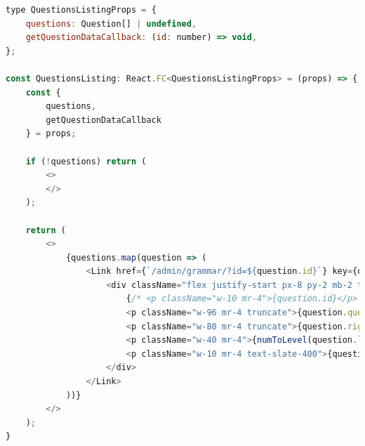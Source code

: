 \newpage
\begin{lstlisting}[language=JavaScript,caption={Úryvek z \M{/src/pages/admin/grammar/index.tsx}; generování seznamu otázek z databáze}, label={xslxgen}]
type QuestionsListingProps = {
    questions: Question[] | undefined,
    getQuestionDataCallback: (id: number) => void,
};

const QuestionsListing: React.FC<QuestionsListingProps> = (props) => {
    const {
        questions,
        getQuestionDataCallback
    } = props;

    if (!questions) return (
        <>
        </>
    );

    return (
        <>
            {questions.map(question => (
                <Link href={`/admin/grammar/?id=${question.id}`} key={question.id} onClick={() => getQuestionDataCallback(question.id)}>
                    <div className="flex justify-start px-8 py-2 mb-2 text-left text-slate-700 hover:ring-2 ring-purple-600 rounded-3xl hover:cursor-pointer font-extrabold">
                        {/* <p className="w-10 mr-4">{question.id}</p> */}
                        <p className="w-96 mr-4 truncate">{question.questionText}</p>
                        <p className="w-80 mr-4 truncate">{question.rightAnswer}</p>
                        <p className="w-40 mr-4">{numToLevel(question.languageLevel)}</p>
                        <p className="w-10 mr-4 text-slate-400">{question.id}</p>
                    </div>
                </Link>
            ))}
        </>
    );
}
\end{lstlisting}